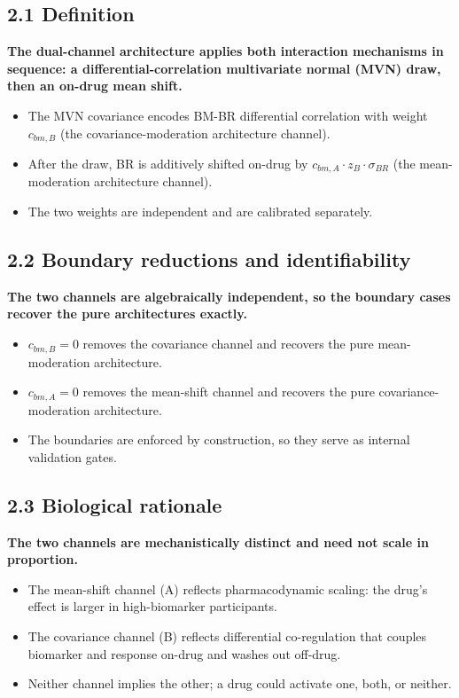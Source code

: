 \documentclass[
  11pt,
]{article}
\begin{document}
\subsection{2.1 Definition}

\textbf{The dual-channel architecture applies both interaction mechanisms in
sequence: a differential-correlation multivariate normal (MVN) draw,
then an on-drug mean shift.}

\begin{itemize}\setlength{\itemsep}{2pt}\setlength{\parskip}{0pt}
\item The MVN covariance encodes BM-BR differential correlation with
  weight $c_{bm,B}$ (the covariance-moderation architecture channel).
\item After the draw, BR is additively shifted on-drug by
  $c_{bm,A} \cdot z_B \cdot \sigma_{BR}$ (the mean-moderation architecture
  channel).
\item The two weights are independent and are calibrated separately.
\end{itemize}

\subsection{2.2 Boundary reductions and identifiability}

\textbf{The two channels are algebraically independent, so the
boundary cases recover the pure architectures exactly.}

\begin{itemize}\setlength{\itemsep}{2pt}\setlength{\parskip}{0pt}
\item $c_{bm,B} = 0$ removes the covariance channel and recovers
  the pure mean-moderation architecture.
\item $c_{bm,A} = 0$ removes the mean-shift channel and recovers
  the pure covariance-moderation architecture.
\item The boundaries are enforced by construction, so they serve as
  internal validation gates.
\end{itemize}

\subsection{2.3 Biological rationale}

\textbf{The two channels are mechanistically distinct and need not
scale in proportion.}

\begin{itemize}\setlength{\itemsep}{2pt}\setlength{\parskip}{0pt}
\item The mean-shift channel (A) reflects pharmacodynamic scaling:
  the drug's effect is larger in high-biomarker participants.
\item The covariance channel (B) reflects differential
  co-regulation that couples biomarker and response on-drug and
  washes out off-drug.
\item Neither channel implies the other; a drug could activate one,
  both, or neither.
\end{itemize}
\end{document}
